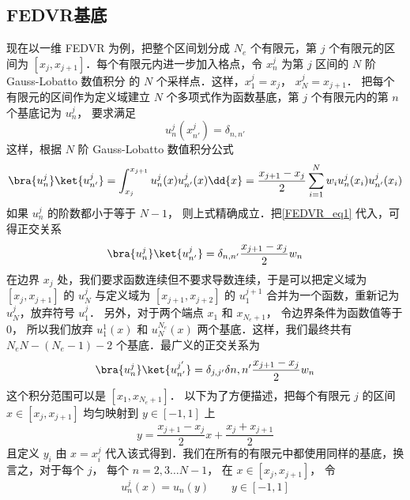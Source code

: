 

\subsection{FEDVR基底}

现在以一维 FEDVR 为例，把整个区间划分成 $N_e$ 个有限元，第 $j$ 个有限元的区间为 $[x_j,x_{j+1}]$．每个有限元内进一步加入格点，令 $x_n^j$ 为第 $j$ 区间的 $N$ 阶 Gauss-Lobatto 数值积分 %
的 $N$ 个采样点．这样，$x_1^j=x_j$，  $x_N^j=x_{j+1}$． 把每个有限元的区间作为定义域建立 $N$ 个多项式作为函数基底，第 $j$ 个有限元内的第 $n$ 个基底记为 $u_n^j$， 要求满足
\begin{equation}\label{FEDVR_eq1}
u_n^j(x_{n'}^j) = \delta_{n,n'}
\end{equation}
这样，根据 $N$ 阶 Gauss-Lobatto 数值积分公式
\begin{equation}
\bra{u_n^j}\ket{u_{n'}^j} = \int_{x_j}^{x_{j+1}} u_n^j(x) u_{n'}^j(x) \dd{x} = \frac{x_{j+1}-x_j}{2} \sum_{i=1}^{N} w_i u_n^j(x_i) u_{n'}^j (x_i)
\end{equation}
如果 $u_n^j$ 的阶数都小于等于 $N-1$， 则上式精确成立．把\autoref{FEDVR_eq1} 代入，可得正交关系
\begin{equation}
\bra{u_n^j}\ket{u_{n'}^j} = \delta_{n,n'} \frac{x_{j+1}-x_j}{2} w_n
\end{equation}
在边界 $x_j$ 处，我们要求函数连续但不要求导数连续，于是可以把定义域为 $[x_j,x_{j+1}]$ 的 $u_N^j$  与定义域为 $[x_{j+1},x_{j+2}]$ 的 $u_1^{j+1}$ 合并为一个函数，重新记为 $u_N^j$，放弃符号 $u_1^j$． 另外，对于两个端点 $x_1$ 和 $x_{N_e+1}$， 令边界条件为函数值等于 0， 所以我们放弃 $u_1^1(x)$ 和 $u_N^{N_e}(x)$ 两个基底．这样，我们最终共有 $N_eN-(N_e-1)-2$ 个基底．最广义的正交关系为
\begin{equation}
\bra{u_n^j}\ket{u_{n'}^{j'}} = \delta_{j,j'}\delta{n,n'} \frac{x_{j+1}-x_j}{2}w_n
\end{equation}
这个积分范围可以是 $[x_1, x_{N_e+1}]$． 以下为了方便描述，把每个有限元 $j$ 的区间 $ x\in[x_j,x_{j+1}]$ 均匀映射到 $y\in[-1,1]$ 上
\begin{equation}
y = \frac{x_{j+1}-x_j}{2} x + \frac{x_j+x_{j+1}}{2}
\end{equation}
且定义 $y_i$ 由 $x=x_i^j$ 代入该式得到．我们在所有的有限元中都使用同样的基底，换言之，对于每个 $j$， 每个 $n=2,3\dots N-1$， 在 $x\in[x_j,x_{j+1}]$， 令
\begin{equation}
u_n^j(x) = u_n(y) \qquad y\in[-1,1]
\end{equation}
